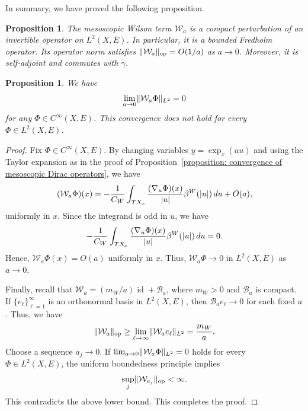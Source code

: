 \documentclass[a4paper,oneside,12pt]{amsart}
\theoremstyle{plain}
\newtheorem{proposition}[theorem]{Proposition}
\theoremstyle{definition}
\theoremstyle{remark}
\DeclarePairedDelimiter{\abs}{\lvert}{\rvert}
\DeclarePairedDelimiter{\norm}{\lVert}{\rVert}
\DeclareMathOperator{\id}{id}
\newcommand{\Ltwonorm}[2][L^2]{\norm{#2}_{#1}}
\DeclarePairedDelimiter{\operatornorm}{\lVert}{\rVert_{\mathrm{op}}}
\newcommand{\mesoscopicWilsonterm}[1][a]{\mathcal{W}_{#1}}
\newcommand{\cutoff}{\beta}
\newcommand{\cutoffWilson}{\cutoff^W}
\newcommand{\mesoscopicWilsontermcompactpert}[1][a]{\mathcal{B}_{#1}}
\begin{document}
In summary, we have proved the following proposition.
\begin{proposition}\label{proposition: mesoscopic Wilson term is Fredholm and self-adjoint}
  The mesoscopic Wilson term $\mesoscopicWilsonterm$ is a compact perturbation of an invertible operator on $L^2(X,E)$.
  In particular, it is a bounded Fredholm operator.
  Its operator norm satisfies $\operatornorm{\mesoscopicWilsonterm} = O(1/a)$ as $a \to 0$.
  Moreover, it is self-adjoint and commutes with $\gamma$.
\end{proposition}

\begin{proposition}\label{proposition: convergence of mesoscopic Wilson terms}
  We have
  \begin{equation}
    \lim_{a \to 0} \Ltwonorm{\mesoscopicWilsonterm\Phi} = 0
  \end{equation}
  for any $\Phi \in C^{\infty}(X,E)$.
  This convergence does not hold for every $\Phi \in L^2(X,E)$.
\end{proposition}
\begin{proof}
  Fix $\Phi \in C^{\infty}(X,E)$.
  By changing variables $y=\exp_x(au)$ and using the Taylor expansion as in the proof of Proposition~\ref{proposition: convergence of mesoscopic Dirac operators}, we have
  \begin{equation}
    (\mesoscopicWilsonterm \Phi)(x) = -\frac{1}{C_W} \int_{TX_x} \frac{(\nabla_u \Phi)(x)}{\abs{u}} \cutoffWilson(\abs{u}) \,du + O(a),
  \end{equation}
  uniformly in $x$.
  Since the integrand is odd in $u$, we have
  \begin{equation}
    -\frac{1}{C_W} \int_{TX_x} \frac{(\nabla_u \Phi)(x)}{\abs{u}} \cutoffWilson(\abs{u}) \,du = 0.
  \end{equation}
  Hence, $\mesoscopicWilsonterm \Phi(x) = O(a)$ uniformly in $x$.
  Thus, $\mesoscopicWilsonterm \Phi \to 0$ in $L^2(X,E)$ as $a \to 0$.

  Finally, recall that $\mesoscopicWilsonterm = (m_W/a)\id + \mesoscopicWilsontermcompactpert$, where $m_W > 0$ and $\mesoscopicWilsontermcompactpert$ is compact.
  If $\{e_{\ell}\}_{\ell=1}^{\infty}$ is an orthonormal basis in $L^2(X,E)$, then $\mesoscopicWilsontermcompactpert e_{\ell} \to 0$ for each fixed $a$.
  Thus, we have
  \begin{equation}
    \operatornorm{\mesoscopicWilsonterm} \ge \lim_{\ell \to \infty} \Ltwonorm{\mesoscopicWilsonterm e_\ell} = \frac{m_W}{a}.
  \end{equation}
  Choose a sequence $a_j \to 0$.
  If $\lim_{a \to 0} \Ltwonorm{\mesoscopicWilsonterm\Phi} = 0$ holds for every $\Phi \in L^2(X,E)$, the uniform boundedness principle implies
  \begin{equation}
    \sup_j \operatornorm{\mesoscopicWilsonterm[a_j]} < \infty.
  \end{equation}
  This contradicts the above lower bound.
  This completes the proof.
\end{proof}
\end{document}
